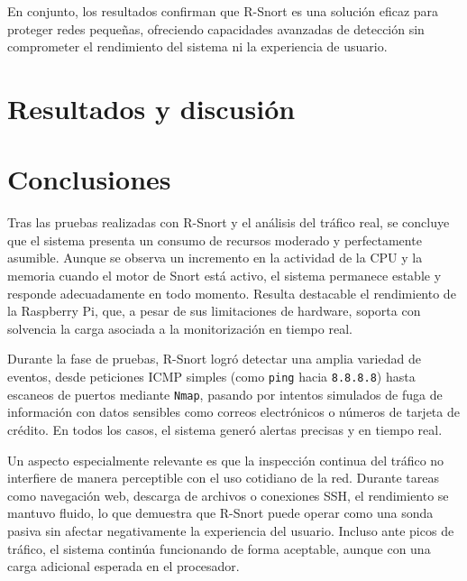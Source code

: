 \documentclass[12pt,a4paper]{report}
\begin{document}
En conjunto, los resultados confirman que R-Snort es una solución eficaz para proteger redes pequeñas, ofreciendo capacidades avanzadas de detección sin comprometer el rendimiento del sistema ni la experiencia de usuario.


\chapter*{Resultados y discusión}

\chapter*{Conclusiones}

Tras las pruebas realizadas con R-Snort y el análisis del tráfico real, se concluye que el sistema presenta un consumo de recursos moderado y perfectamente asumible. Aunque se observa un incremento en la actividad de la CPU y la memoria cuando el motor de Snort está activo, el sistema permanece estable y responde adecuadamente en todo momento. Resulta destacable el rendimiento de la Raspberry Pi, que, a pesar de sus limitaciones de hardware, soporta con solvencia la carga asociada a la monitorización en tiempo real.\newline

Durante la fase de pruebas, R-Snort logró detectar una amplia variedad de eventos, desde peticiones ICMP simples (como \texttt{ping} hacia \texttt{8.8.8.8}) hasta escaneos de puertos mediante \texttt{Nmap}, pasando por intentos simulados de fuga de información con datos sensibles como correos electrónicos o números de tarjeta de crédito. En todos los casos, el sistema generó alertas precisas y en tiempo real.\newline

Un aspecto especialmente relevante es que la inspección continua del tráfico no interfiere de manera perceptible con el uso cotidiano de la red. Durante tareas como navegación web, descarga de archivos o conexiones SSH, el rendimiento se mantuvo fluido, lo que demuestra que R-Snort puede operar como una sonda pasiva sin afectar negativamente la experiencia del usuario. Incluso ante picos de tráfico, el sistema continúa funcionando de forma aceptable, aunque con una carga adicional esperada en el procesador.\newline
\end{document}
